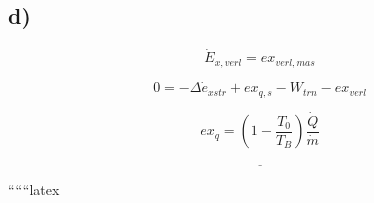 

\subsection*{d)}

\[
\dot{E}_{x,verl} = ex_{verl,mas}
\]

\[
0 = -\Delta \dot{e}_{xstr} + ex_{q,s} - W_{trn} - ex_{verl}
\]

\[
ex_{q} = \left( 1 - \frac{T_0}{T_B} \right) \frac{\dot{Q}}{\dot{m}}
\]

\[
\underline{\hspace{5cm}}
\]

``````latex